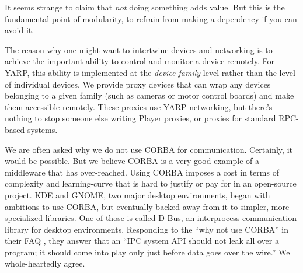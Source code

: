 It seems strange to claim that {\em not} doing something adds value.
But this is the fundamental point of modularity, to refrain from 
making a dependency if you can avoid it.

The reason why one might want to intertwine devices and networking
is to achieve the important ability to control and monitor a device 
remotely.  For YARP, this ability is implemented at the 
{\em device family} level rather than the level of individual devices.
We provide proxy devices that can wrap any devices belonging to
a given family (such as cameras or motor control boards) and make 
them accessible remotely.  These proxies use YARP networking, but
there's nothing to stop someone else writing Player proxies, or 
proxies for standard RPC-based systems.

We are often asked why we do not use CORBA for communication.
Certainly, it would be possible.  But we believe CORBA is a very good
example of a middleware that has over-reached.  Using CORBA imposes a
cost in terms of complexity and learning-curve that is hard to justify
or pay for in an open-source project.  KDE and GNOME, two major
desktop environments, began with ambitions to use CORBA, but eventually
backed away from it to simpler, more specialized libraries.
One of those is called D-Bus, 
an interprocess communication library for desktop environments.
Responding to the ``why not use CORBA'' in their FAQ  \cite{dbus},
they answer that an
``IPC system API should not leak all over a program; it should come
into play only just before data goes over the wire.''  
We whole-heartedly agree.



%
%




